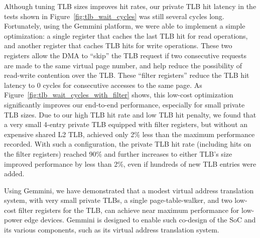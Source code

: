 Although tuning TLB sizes improves hit rates, our private TLB hit latency in the tests shown in Figure~\ref{fig:tlb_wait_cycles} was still several cycles long. Fortunately, using the Gemmini platform, we were able to implement a simple optimization: a single register that caches the last TLB hit for read operations, and another register that caches TLB hits for write operations. These two registers allow the DMA to ``skip'' the TLB request if two consecutive requests are made to the same virtual page number, and help reduce the possibility of read-write contention over the TLB. These ``filter registers'' reduce the TLB hit latency to 0 cycles for consecutive accesses to the same page. As Figure~\ref{fig:tlb_wait_cycles_with_filter} shows, this low-cost optimization significantly improves our end-to-end performance, especially for small private TLB sizes. Due to our high TLB hit rate and low TLB hit penalty, we found that a very small 4-entry private TLB equipped with filter registers, but without an expensive shared L2 TLB, achieved only 2\% less than the maximum performance recorded. With such a configuration, the private TLB hit rate (including hits on the filter registers) reached 90\% and further increases to either TLB's size improved performance by less than 2\%, even if hundreds of new TLB entries were added.

Using Gemmini, we have demonstrated that a modest virtual address translation system, with very small private TLBs, a single page-table-walker, and two low-cost filter registers for the TLB, can achieve near maximum performance for low-power edge devices. Gemmini is designed to enable such co-design of the SoC and its various components, such as its virtual address translation system.
